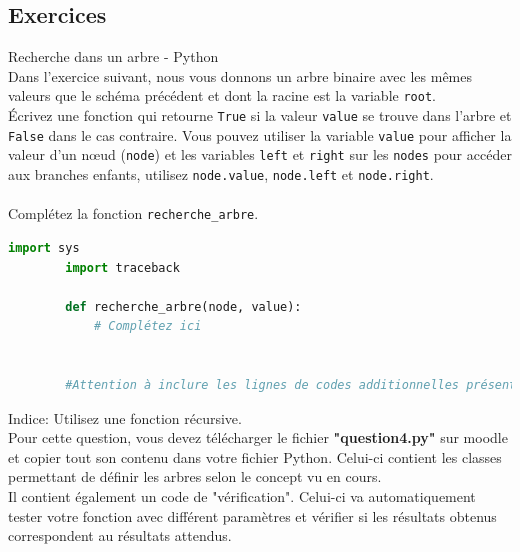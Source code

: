     \subsection{Exercices}
    
    \begin{Exercice}[15 minutes] Recherche dans un arbre - Python\\
        
        Dans l'exercice suivant, nous vous donnons un arbre binaire avec les mêmes valeurs que le schéma précédent et dont la racine est la variable \lstinline{root}.\\
    
        Écrivez une fonction qui retourne \lstinline{True} si la valeur \lstinline{value} se trouve dans l'arbre et \lstinline{False} dans le cas contraire. Vous pouvez utiliser la variable \lstinline{value} pour afficher la valeur d'un nœud (\lstinline{node}) et les variables \lstinline{left} et \lstinline{right} sur les \lstinline{nodes} pour accéder aux branches enfants, utilisez \lstinline{node.value}, \lstinline{node.left} et \lstinline{node.right}.\\\\
        Complétez la fonction \lstinline{recherche_arbre}.\\
        \begin{lstlisting}[language=Python]
        import sys
        import traceback
    
        def recherche_arbre(node, value):
            # Complétez ici
            
            
        #Attention à inclure les lignes de codes additionnelles présentes dans le fichier "question4.py" sur Moodle
        \end{lstlisting}
    
        \begin{conseil}
        Indice: Utilisez une fonction récursive.\\
        
        Pour cette question, vous devez télécharger le fichier \textbf{"question4.py"} sur moodle et copier tout son contenu dans votre fichier Python. Celui-ci contient les classes permettant de définir les arbres selon le concept vu en cours. \\
        
        Il contient également un code de "vérification". Celui-ci va automatiquement tester votre fonction avec différent paramètres et vérifier si les résultats obtenus correspondent au résultats attendus.
        \end{conseil}
    
        \begin{solution}
            
        \end{solution}

    
    \end{Exercice}
    
    
